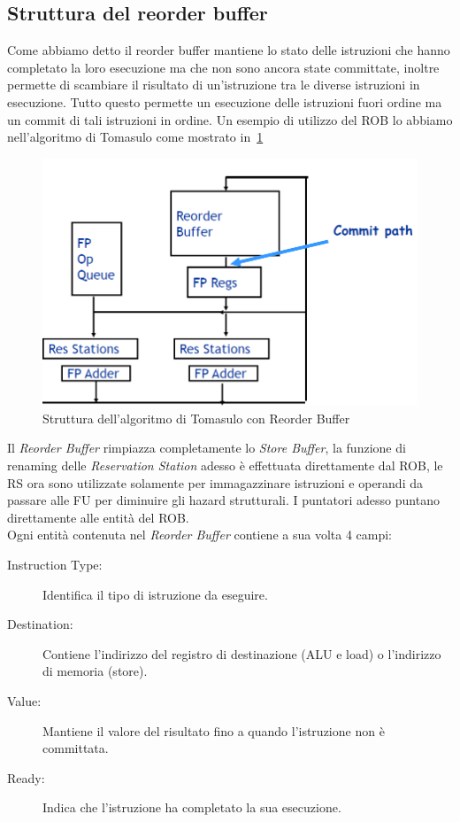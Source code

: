 \subsection{Struttura del reorder buffer}
Come abbiamo detto il reorder buffer mantiene lo stato delle istruzioni che hanno completato la loro esecuzione ma che non sono ancora state committate, inoltre permette di scambiare il risultato di un'istruzione tra le diverse istruzioni in esecuzione. Tutto questo permette un esecuzione delle istruzioni fuori ordine ma un commit di tali istruzioni in ordine. Un esempio di utilizzo del ROB lo abbiamo nell'algoritmo di Tomasulo come mostrato in \figurename\,\ref{fig:tomarob}
\begin{figure}[htb]
\centering
\includegraphics[scale=0.5]{img/tomarob.png}
\caption{Struttura dell'algoritmo di Tomasulo con Reorder Buffer}\label{fig:tomarob}
\end{figure}
Il \emph{Reorder Buffer} rimpiazza completamente lo \emph{Store Buffer}, la funzione di renaming delle \emph{Reservation Station} adesso è effettuata direttamente dal ROB, le RS ora sono utilizzate solamente per immagazzinare istruzioni e operandi da passare alle FU per diminuire gli hazard strutturali.
I puntatori adesso puntano direttamente alle entità del ROB.\\
Ogni entità contenuta nel \emph{Reorder Buffer} contiene a sua volta 4 campi:
\begin{description}
\item[Instruction Type:] Identifica il tipo di istruzione da eseguire.
\item[Destination:] Contiene l'indirizzo del registro di destinazione (ALU e load) o l'indirizzo di memoria (store).
\item[Value:] Mantiene il valore del risultato fino a quando l'istruzione non è committata.
\item[Ready:] Indica che l'istruzione ha completato la sua esecuzione.
\end{description}
